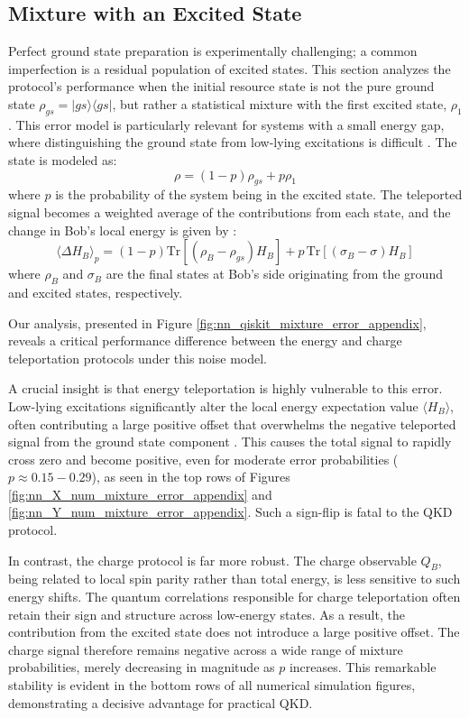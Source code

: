 \subsection{Mixture with an Excited State}



Perfect ground state preparation is experimentally challenging; a common imperfection is a residual population of excited states. This section analyzes the protocol's performance when the initial resource state is not the pure ground state $\rho_{gs} = |gs\rangle\langle gs|$, but rather a statistical mixture with the first excited state, $\rho_1$. This error model is particularly relevant for systems with a small energy gap, where distinguishing the ground state from low-lying excitations is difficult \cite{QKDbyQET}. The state is modeled as:
\begin{equation*}
\rho = (1-p)\rho_{gs} + p\rho_1
\end{equation*}
where $p$ is the probability of the system being in the excited state. The teleported signal becomes a weighted average of the contributions from each state, and the change in Bob's local energy is given by \cite{QKDbyQET}:
\begin{equation*}
\langle\Delta H_B\rangle_p = (1-p)\text{Tr}[(\rho_B - \rho_{gs})H_B] + p\,\text{Tr}[(\sigma_B - \sigma)H_B]
\end{equation*}
where $\rho_B$ and $\sigma_B$ are the final states at Bob's side originating from the ground and excited states, respectively.

Our analysis, presented in Figure \ref{fig:nn_qiskit_mixture_error_appendix}, reveals a critical performance difference between the energy and charge teleportation protocols under this noise model.

A crucial insight is that energy teleportation is highly vulnerable to this error. Low-lying excitations significantly alter the local energy expectation value $\langle H_B \rangle$, often contributing a large positive offset that overwhelms the negative teleported signal from the ground state component \cite{QKDbyQET}. This causes the total signal to rapidly cross zero and become positive, even for moderate error probabilities ($p \approx 0.15-0.29$), as seen in the top rows of Figures \ref{fig:nn_X_num_mixture_error_appendix} and \ref{fig:nn_Y_num_mixture_error_appendix}. Such a sign-flip is fatal to the QKD protocol.

In contrast, the charge protocol is far more robust. The charge observable $Q_B$, being related to local spin parity rather than total energy, is less sensitive to such energy shifts. The quantum correlations responsible for charge teleportation often retain their sign and structure across low-energy states. As a result, the contribution from the excited state does not introduce a large positive offset. The charge signal therefore remains negative across a wide range of mixture probabilities, merely decreasing in magnitude as $p$ increases. This remarkable stability is evident in the bottom rows of all numerical simulation figures, demonstrating a decisive advantage for practical QKD.

